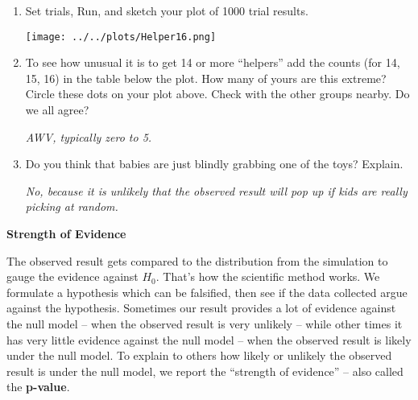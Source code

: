 \begin{enumerate}
\begin{key}
{\it 12 in my first, 8 in my second }
\end{key}

    \item  Set   trials, Run, and   
              sketch your plot of 1000 trial results. 
\begin{students}
  \vspace{4cm}
\end{students}

\begin{key}
    \texttt{[image: ../../plots/Helper16.png]}
\end{key}
\item To see how unusual it is to get 14 or more ``helpers'' add the
  counts (for 14, 15, 16) in the table below the plot.
   How many of yours are this extreme? Circle
  these dots on your plot above. Check with the other groups
  nearby. Do we all agree?
\begin{students}
  \vspace{1.5cm}
\end{students}

\begin{key}
{\it  AWV, typically zero to 5.
}
\end{key}
\item  Do you think that babies are just blindly grabbing one of
      the toys? Explain.
\begin{students}
  \vspace{2.5cm}
\end{students}

\begin{key}
  {\it No, because it is unlikely that the observed result will pop up
    if  kids are really picking at random. }
\end{key}

  \end{enumerate}
\begin{center}
        {\large\bf Strength of Evidence}
 \end{center}
      The observed result gets compared to the distribution from the
      simulation to gauge the evidence against $H_0$.  That's
      how the scientific method works.  We formulate a hypothesis
      which can be falsified, then see if the data collected argue
      against the hypothesis. Sometimes our result provides a lot of
      evidence against the null model  -- when the observed result is very
      unlikely -- while other times it has very little evidence against
      the null model -- when the observed result is likely under the null
      model. To explain to others  how likely or unlikely the
      observed result is under the null model, we  report the
      ``strength of evidence'' -- also called the {\bf p-value}. 

